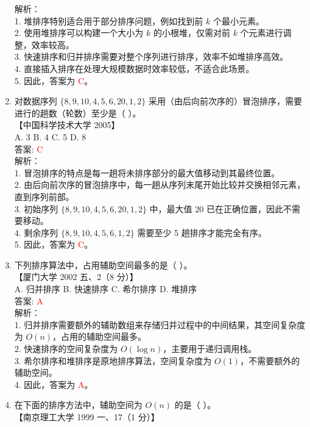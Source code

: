 \documentclass[lang=cn,newtx,10pt,scheme=chinese]{../../../elegantbook}
\begin{document}
\begin{enumerate}
    解析：\\
    1. 堆排序特别适合用于部分排序问题，例如找到前 $k$ 个最小元素。\\
    2. 使用堆排序可以构建一个大小为 $k$ 的小根堆，仅需对前 $k$ 个元素进行调整，效率较高。\\
    3. 快速排序和归并排序需要对整个序列进行排序，效率不如堆排序高效。\\
    4. 直接插入排序在处理大规模数据时效率较低，不适合此场景。\\
    5. 因此，答案为 \textcolor{red}{C}。\\
    \item 对数据序列 $\{8, 9, 10, 4, 5, 6, 20, 1, 2\}$ 采用（由后向前次序的）冒泡排序，需要进行的趟数（轮数）至少是（ ）。\\
    【中国科学技术大学 2005】 \\

    A. 3 \quad B. 4 \quad C. 5 \quad D. 8 \\

    答案: \textcolor{red}{C} \\

    解析：\\
    1. 冒泡排序的特点是每一趟将未排序部分的最大值移动到其最终位置。\\
    2. 由后向前次序的冒泡排序中，每一趟从序列末尾开始比较并交换相邻元素，直到序列前部。\\
    3. 初始序列 $\{8, 9, 10, 4, 5, 6, 20, 1, 2\}$ 中，最大值 $20$ 已在正确位置，因此不需要移动。\\
    4. 剩余序列 $\{8, 9, 10, 4, 5, 6, 1, 2\}$ 需要至少 5 趟排序才能完全有序。\\
    5. 因此，答案为 \textcolor{red}{C}。\\ 

    \item 下列排序算法中，占用辅助空间最多的是（ ）。\\
    【厦门大学 2002 五、2（8 分）】 \\

    A. 归并排序 \quad B. 快速排序 \quad C. 希尔排序 \quad D. 堆排序 \\

    答案: \textcolor{red}{A} \\

    解析：\\
    1. 归并排序需要额外的辅助数组来存储归并过程中的中间结果，其空间复杂度为 $O(n)$，占用的辅助空间最多。\\
    2. 快速排序的空间复杂度为 $O(\log n)$，主要用于递归调用栈。\\
    3. 希尔排序和堆排序是原地排序算法，空间复杂度为 $O(1)$，不需要额外的辅助空间。\\
    4. 因此，答案为 \textcolor{red}{A}。\\
    \item 在下面的排序方法中，辅助空间为 $O(n)$ 的是（ ）。\\
    【南京理工大学 1999 一、17（1 分）】 \\


\end{enumerate}
\end{document}
